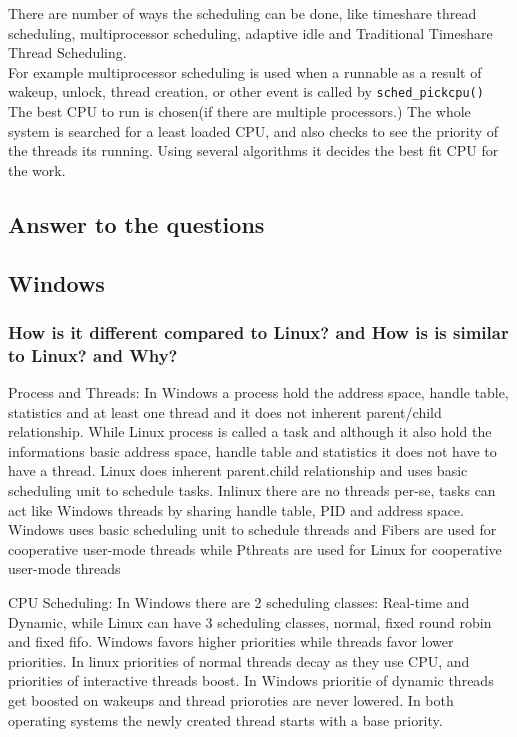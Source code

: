 \documentclass[letterpaper,10pt,draftclsnofoot,onecolumn]{IEEEtran}
\begin{document}
There are number of ways the scheduling can be done, like timeshare thread scheduling, multiprocessor scheduling, adaptive idle and Traditional Timeshare Thread Scheduling.\\

For example multiprocessor scheduling is used when a runnable as a result of wakeup, unlock, thread creation, or other event is called by \verb|sched_pickcpu()| The best CPU to run is chosen(if there are multiple processors.) The whole system is searched for a least loaded CPU, and also checks to see the priority of the threads its running. Using several algorithms it decides the best fit CPU for the work.\cite{[2]}

\subsection*{Answer to the questions}
\subsection*{Windows}
\subsubsection*{How is it different compared to Linux? and How is is similar to Linux? and Why?}

Process and Threads: In Windows a process hold the address space, handle table, statistics and at least one thread and it does not inherent parent/child relationship. While Linux process is called a task and although it also hold the informations basic address space, handle table and statistics it does not have to have a thread. Linux does inherent parent.child relationship and uses basic scheduling unit to schedule tasks. Inlinux there are no threads per-se, tasks can act like Windows threads by sharing handle table, PID and address space. Windows uses basic scheduling unit to schedule threads and Fibers are used for cooperative user-mode threads while Pthreats are used for Linux for cooperative user-mode threads

CPU Scheduling: In Windows there are 2 scheduling classes: Real-time and Dynamic, while Linux can have 3 scheduling classes, normal, fixed round robin and fixed fifo. Windows favors higher priorities while threads favor lower priorities. In linux priorities of normal threads decay as they use CPU,  and priorities of interactive threads boost. In Windows prioritie of dynamic threads get boosted on wakeups and thread prioroties are never lowered. In both operating systems the newly created thread starts with a base priority.
\end{document}
